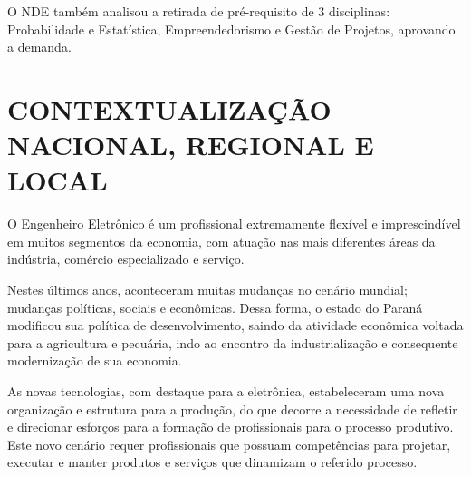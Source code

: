 O NDE também analisou a retirada de pré-requisito de 3 disciplinas: Probabilidade e Estatística, Empreendedorismo e Gestão de Projetos, aprovando a demanda.




\section{CONTEXTUALIZAÇÃO NACIONAL, REGIONAL E LOCAL}

O Engenheiro Eletrônico é um profissional extremamente flexível e imprescindível em muitos segmentos da economia, com atuação nas mais diferentes áreas da indústria, comércio especializado e serviço.

Nestes últimos anos, aconteceram muitas mudanças no cenário mundial; mudanças políticas, sociais e econômicas. Dessa forma, o estado do Paraná modificou sua política de desenvolvimento, saindo da atividade econômica voltada para a agricultura e pecuária, indo ao encontro da industrialização e consequente modernização de sua economia.

As novas tecnologias, com destaque para a eletrônica, estabeleceram uma nova organização e estrutura para a produção, do que decorre a necessidade de refletir e direcionar esforços para a formação de profissionais para o processo produtivo. Este novo cenário requer profissionais que possuam competências para projetar, executar e manter produtos e serviços que dinamizam o referido processo.

